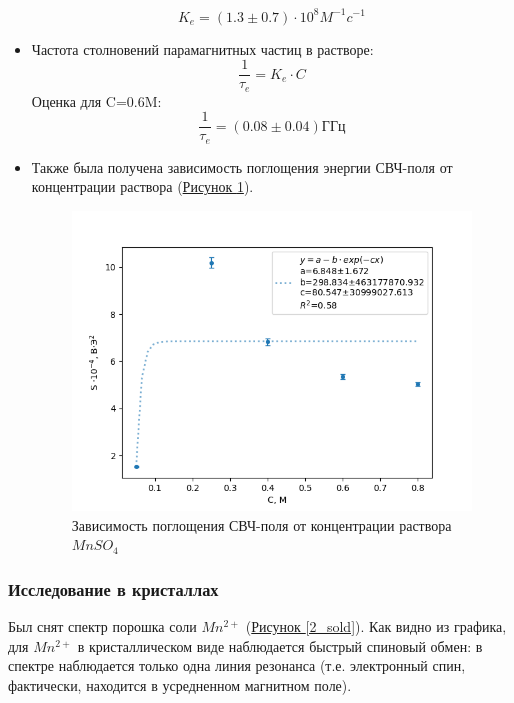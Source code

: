 \documentclass{article}
\begin{document}
\begin{itemize}
\begin{equation*}
    K_e = (1.3 \pm 0.7)\cdot 10^8 M^{-1}c^{-1}
\end{equation*}

\item Частота столновений парамагнитных частиц в растворе:
\begin{equation*}
    \frac{1}{\tau_e} = K_e\cdot C
\end{equation*}
Оценка для C=0.6M:
\begin{equation*}
    \frac{1}{\tau_e} = (0.08 \pm 0.04) \text{ГГц}
\end{equation*}

\item  Также была получена зависимость поглощения энергии СВЧ-поля от концентрации раствора (\hyperref[2_final_exp]{Рисунок \ref*{2_final_exp}}).


\begin{figure}[h!]
        \centering
        \includegraphics[scale = 0.7]{2.1/2_final_exp.png}
        \caption{Зависимость поглощения СВЧ-поля от концентрации раствора $MnSO_4$}
        \label{2_final_exp}
    \end{figure}

\end{itemize}

\newpage
\subsubsection{Исследование в кристаллах}
Был снят спектр порошка соли $Mn^{2+}$  (\hyperref[2_sold]{Рисунок \ref*{2_sold}}).
Как видно из графика, для $Mn^{2+}$ в кристаллическом виде наблюдается быстрый спиновый обмен:  в спектре наблюдается только одна линия резонанса (т.е. электронный спин, фактически, находится в 
усредненном магнитном поле).
\end{document}

